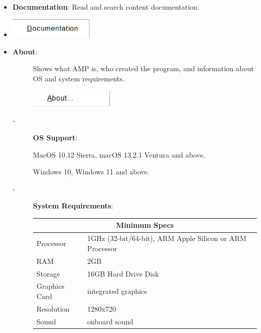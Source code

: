 \documentclass{article}
\begin{document}
\begin{itemize}
    \item \textbf{Documentation}: Read and search content documentation:
    \item[] \includegraphics[width=4cm]{Images/Help Documentation.png}
    
    \item \textbf{About}:
    \begin{description}
        \item[] Shows what AMP is, who created the program, and information about OS and system requirements.
        \item[] \includegraphics[width=4cm]{Images/Help About.png}
        
        \vspace{0.5cm}
        
        \item[-] \textbf{OS Support}:        
            \item[]  MacOS 10.12 Sierra, macOS 13.2.1 Ventura and above.
            \item[]  Windows 10, Windows 11 and above.
            \vspace{0.2cm}
        \item[-] \textbf{System Requirements}:

            {
            \begin{tabular}{ |p{3cm}|p{10cm}| }
            \hline
            \multicolumn{2}{|c|}{\textbf{Minimum Specs}} \\
            \hline
            Processor & 1GHz (32-bit/64-bit), ARM Apple Silicon or ARM Processor \\
            RAM & 2GB \\
            Storage & 16GB Hard Drive Disk \\
            Graphics Card & integrated graphics \\
            Resolution & 1280x720 \\
            Sound & onboard sound \\
            \hline
            \end{tabular}

}
\end{description}
\end{itemize}
\end{document}
